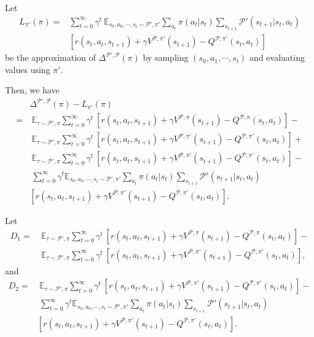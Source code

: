 \documentclass[letterpaper]{article} %
\def\E{{\mathbb{E}}}
\def\P{{\mathcal{P}}}
\begin{document}
Let
{\small
\begin{align*}
L_{\pi'}(\pi)=
&\sum_{t=0}^{\infty}\gamma^t\ 
\E_{s_0,a_0,\cdots,s_t\sim\P',\pi'}
\sum_{a_t}\pi(a_t|s_t)
\sum_{s_{t+1}}\P'(s_{t+1}|s_t,a_t)
\\
&\left[
r(s_t,a_t,s_{t+1})+\gamma V^{\P, {\pi'}}(s_{t+1})-Q^{\P, {\pi'}}(s_t,a_t)
\right]
\end{align*}
}\noindent
be the approximation of $\Delta^{\P',\P}(\pi)$ by sampling $(s_0,a_1,\cdots,s_t)$ and evaluating values using $\pi'$. 

Then, we have
{\small
\begin{align*}
&\Delta^{\P',\P}(\pi)-L_{\pi'}(\pi)
\\
=&\ 
\E_{\tau\sim\P', {\pi}}\sum_{t=0}^{\infty}\gamma^t\ 
\left[
r(s_t,a_t,s_{t+1})+\gamma V^{\P, {\pi}}(s_{t+1})-Q^{\P, {\pi}}(s_t,a_t)
\right]-
\\
&\ 
\E_{\tau\sim\P', {\pi}}\sum_{t=0}^{\infty}\gamma^t\ 
\left[
r(s_t,a_t,s_{t+1})+\gamma V^{\P, {\pi'}}(s_{t+1})-Q^{\P, {\pi'}}(s_t,a_t)
\right]+
\\
&\ 
\E_{\tau\sim \P', {\pi}}\sum_{t=0}^{\infty}\gamma^t\ 
\left[
r(s_t,a_t,s_{t+1})+\gamma V^{\P, {\pi'}}(s_{t+1})-Q^{\P, {\pi'}}(s_t,a_t)
\right]-
\\
&\ 
\sum_{t=0}^{\infty}\gamma^t
\E_{s_0,a_0,\cdots,s_t\sim \P', {\pi'}}
\sum_{a_t}\pi(a_t|s_t)
\sum_{s_{t+1}}\P'(s_{t+1}|s_t,a_t)
\\
&\left[
r(s_t,a_t,s_{t+1})+\gamma V^{\P, {\pi'}}(s_{t+1})-Q^{\P, {\pi'}}(s_t,a_t)
\right].
\end{align*}
}\noindent

Let
{\small
\begin{align*}
D_1=&\ 
\E_{\tau\sim \P', {\pi}}\sum_{t=0}^{\infty}\gamma^t\ 
\left[
r(s_t,a_t,s_{t+1})+\gamma V^{\P, {\pi}}(s_{t+1})-Q^{\P, {\pi}}(s_t,a_t)
\right]-
\\
&\ 
\E_{\tau\sim \P', {\pi}}\sum_{t=0}^{\infty}\gamma^t\ 
\left[
r(s_t,a_t,s_{t+1})+\gamma V^{\P, {\pi'}}(s_{t+1})-Q^{\P, {\pi'}}(s_t,a_t)
\right],
\end{align*}
}\noindent
and
{\small
\begin{align*}
D_2=&\ 
\E_{\tau\sim \P', {\pi}}\sum_{t=0}^{\infty}\gamma^t\ 
\left[
r(s_t,a_t,s_{t+1})+\gamma V^{\P, {\pi'}}(s_{t+1})-Q^{\P, {\pi'}}(s_t,a_t)
\right]-
\\
&\ 
\sum_{t=0}^{\infty}\gamma^t
\E_{s_0,a_0,\cdots,s_t\sim \P', {\pi'}}
\sum_{a_t}\pi(a_t|s_t)
\sum_{s_{t+1}}\P'(s_{t+1}|s_t,a_t)
\\
&\left[
r(s_t,a_t,s_{t+1})+\gamma V^{\P, {\pi'}}(s_{t+1})-Q^{\P, {\pi'}}(s_t,a_t)
\right].
\end{align*}
}\noindent
\end{document}
